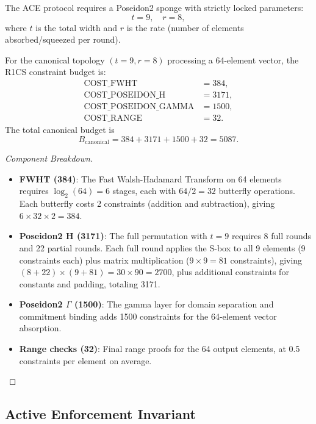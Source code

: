 \documentclass[11pt]{article}
\begin{document}
\begin{definition}
The ACE protocol requires a Poseidon2 sponge with strictly locked parameters:
\[
t = 9, \quad r = 8,
\]
where $t$ is the total width and $r$ is the rate (number of elements absorbed/squeezed per round).
\end{definition}

\begin{proposition}
For the canonical topology $(t=9, r=8)$ processing a 64-element vector, the R1CS constraint budget is:
\begin{align*}
\text{COST\_FWHT} &= 384, \\
\text{COST\_POSEIDON\_H} &= 3171, \\
\text{COST\_POSEIDON\_GAMMA} &= 1500, \\
\text{COST\_RANGE} &= 32.
\end{align*}
The total canonical budget is
\[
B_{\text{canonical}} = 384 + 3171 + 1500 + 32 = 5087.
\]
\end{proposition}

\begin{proof}[Component Breakdown]
\begin{itemize}
\item \textbf{FWHT (384)}: The Fast Walsh-Hadamard Transform on 64 elements requires $\log_2(64) = 6$ stages, each with $64/2 = 32$ butterfly operations. Each butterfly costs 2 constraints (addition and subtraction), giving $6 \times 32 \times 2 = 384$.
\item \textbf{Poseidon2 H (3171)}: The full permutation with $t=9$ requires 8 full rounds and 22 partial rounds. Each full round applies the S-box to all 9 elements (9 constraints each) plus matrix multiplication ($9 \times 9 = 81$ constraints), giving $(8 + 22) \times (9 + 81) = 30 \times 90 = 2700$, plus additional constraints for constants and padding, totaling 3171.
\item \textbf{Poseidon2 $\Gamma$ (1500)}: The gamma layer for domain separation and commitment binding adds 1500 constraints for the 64-element vector absorption.
\item \textbf{Range checks (32)}: Final range proofs for the 64 output elements, at 0.5 constraints per element on average.
\end{itemize}
\end{proof}

\subsection{Active Enforcement Invariant}
\end{document}
